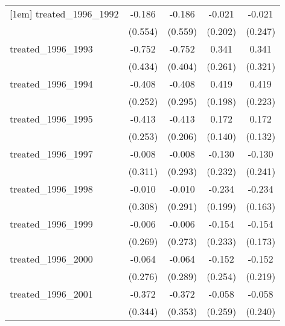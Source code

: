{\begin{tabular}{l*{4}{c}}
[1em]
treated\_1996\_1992&      -0.186         &      -0.186         &      -0.021         &      -0.021         \\
            &     (0.554)         &     (0.559)         &     (0.202)         &     (0.247)         \\
[1em]
treated\_1996\_1993&      -0.752         &      -0.752         &       0.341         &       0.341         \\
            &     (0.434)         &     (0.404)         &     (0.261)         &     (0.321)         \\
[1em]
treated\_1996\_1994&      -0.408         &      -0.408         &       0.419\sym{*}  &       0.419         \\
            &     (0.252)         &     (0.295)         &     (0.198)         &     (0.223)         \\
[1em]
treated\_1996\_1995&      -0.413         &      -0.413\sym{*}  &       0.172         &       0.172         \\
            &     (0.253)         &     (0.206)         &     (0.140)         &     (0.132)         \\
[1em]
treated\_1996\_1997&      -0.008         &      -0.008         &      -0.130         &      -0.130         \\
            &     (0.311)         &     (0.293)         &     (0.232)         &     (0.241)         \\
[1em]
treated\_1996\_1998&      -0.010         &      -0.010         &      -0.234         &      -0.234         \\
            &     (0.308)         &     (0.291)         &     (0.199)         &     (0.163)         \\
[1em]
treated\_1996\_1999&      -0.006         &      -0.006         &      -0.154         &      -0.154         \\
            &     (0.269)         &     (0.273)         &     (0.233)         &     (0.173)         \\
[1em]
treated\_1996\_2000&      -0.064         &      -0.064         &      -0.152         &      -0.152         \\
            &     (0.276)         &     (0.289)         &     (0.254)         &     (0.219)         \\
[1em]
treated\_1996\_2001&      -0.372         &      -0.372         &      -0.058         &      -0.058         \\
            &     (0.344)         &     (0.353)         &     (0.259)         &     (0.240)         \\

\end{tabular}}
